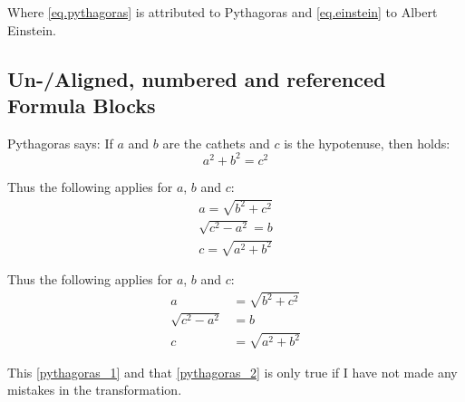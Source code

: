 \documentclass[ 12pt, a4paper, parskip=full]{scrartcl}
\begin{document}
Where \eqref{eq.pythagoras} is attributed to Pythagoras and \eqref{eq.einstein} to Albert Einstein.

\subsection{Un-/Aligned, numbered and referenced Formula Blocks}

Pythagoras says: If $a$ and $b$ are the cathets and $c$ is the hypotenuse, then holds: 
\begin{displaymath} %
  a^2+b^2=c^2 
\end{displaymath} 

Thus the following applies for $a$, $b$ and $c$: 
\begin{gather} %
  a=\sqrt{b^2+c^2}  \label{pythagoras_1} \\ 
  \sqrt{c^2-a^2}=b  \nonumber \\
  c=\sqrt{a^2+b^2}  \nonumber
\end{gather}

Thus the following applies for $a$, $b$ and $c$: 
\begin{align} %
  a&=\sqrt{b^2+c^2}      \label{pythagoras_2} \\ 
  \sqrt{c^2-a^2}&=b      \nonumber \\
  c&=\sqrt{a^2+b^2}      \nonumber
\end{align}

This \eqref{pythagoras_1} and that \eqref{pythagoras_2} is only true if I have not made any mistakes in the transformation.
\end{document}

